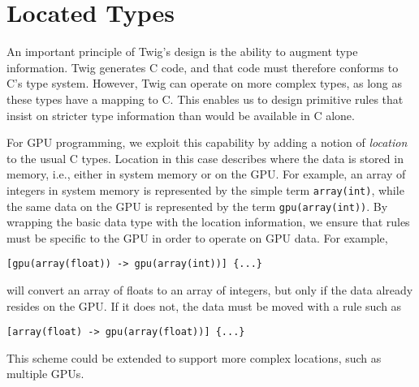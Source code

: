 
\section{Located Types}

An important principle of Twig's design is the ability to augment type
information. Twig generates C code, and that code must therefore conforms to C's
type system. However, Twig can operate on more complex types, as long as these
types have a mapping to C. This enables us to design primitive rules that insist
on stricter type information than would be available in C alone.

For GPU programming, we exploit this capability by adding a notion of
\emph{location} to the usual C types. Location in this case describes where the
data is stored in memory, i.e., either in system memory or on the GPU. For
example, an array of integers in system memory is represented by the simple term
\texttt{array(int)}, while the same data on the GPU is represented by the term
\texttt{gpu(array(int))}. By wrapping the basic data type with the location
information, we ensure that rules must be specific to the GPU in order to
operate on GPU data. For example,

\begin{verbatim}
[gpu(array(float)) -> gpu(array(int))] {...}
\end{verbatim}

will convert an array of floats to an array of integers, but only if the data
already resides on the GPU. If it does not, the data must be moved with a rule
such as

\begin{verbatim}
[array(float) -> gpu(array(float))] {...}
\end{verbatim}

This scheme could be extended to support more complex locations, such as
multiple GPUs.
